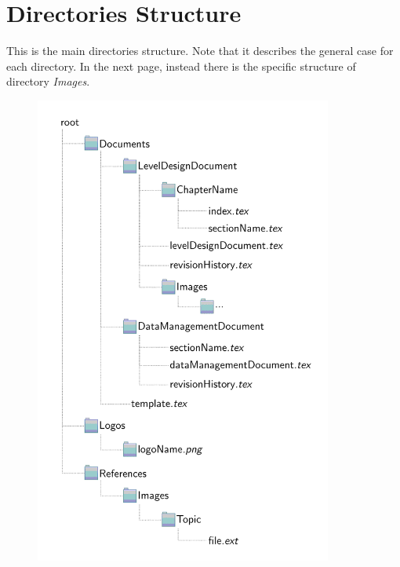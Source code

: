 \section{Directories Structure}
This is the main directories structure. Note that it describes the general case for each directory. In the next page, instead there is the specific structure of directory \textit{Images}. 
\begin{center}
  \begin{figure}[H]
  \centering
  \includegraphics[height=15.5cm]{directories}
  \end{figure}
\end{center}
